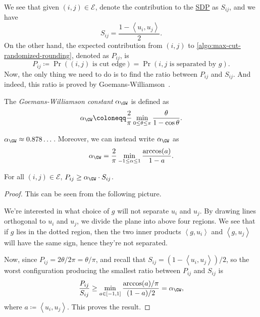 We see that given \((i, j)\in \mathcal{E} \), denote the contribution to the \hyperref[eq:max-cut]{SDP} as \(S_{ij} \), and we have
\[
	S_{ij}= \frac{1 - \left\langle u_i, u_j \right\rangle }{2}.
\]
On the other hand, the expected contribution from \((i, j)\) to \autoref{algo:max-cut-randomized-rounding}, denoted as \(P_{ij} \), is
\[
	P_{ij}\coloneqq  \Pr((i, j)\text{ is cut edge} ) = \Pr(i, j \text{ is separated by \(g\)} ).
\]
Now, the only thing we need to do is to find the ratio between \(P_{ij} \) and \(S_{ij} \). And indeed, this ratio is proved by Goemans-Williamson~\cite{goemans1995improved}.

\begin{notation}\label{not:GW}
	The \emph{Goemans-Williamson constant} \(\alpha _{\GW }\) is defined as
	\[
		\alpha _{\GW }\coloneqq \frac{2}{\pi }\min _{0 \leq \theta \leq \pi }\frac{\theta }{1 - \cos \theta }.
	\]
\end{notation}

\begin{remark}
	\(\alpha _{\GW }\approx 0.878\dots \). Moreover, we can instead write \(\alpha _\GW \) as
	\[
		\alpha _{\GW } = \frac{2}{\pi }\min _{-1\leq \alpha \leq 1} \frac{\arccos(a)}{1 - a}.
	\]
\end{remark}

\begin{lemma}\label{lma:max-cut}
	For all \((i, j)\in \mathcal{E} \), \(P_{ij} \geq \alpha _{\GW } \cdot S_{ij} \).
\end{lemma}
\begin{proof}
	This can be seen from the following picture.
	\begin{center}
	\end{center}
	We're interested in what choice of \(g\) will not separate \(u_i\) and \(u_j\). By drawing lines orthogonal to \(u_i\) and \(u_j\), we divide the plane into above four regions. We see that if \(g\) lies in the dotted region, then the two inner products \(\left\langle g, u_i \right\rangle \) and \(\left\langle g, u_j \right\rangle \) will have the same sign, hence they're not separated.

	Now, since \(P_{ij} = 2\theta / 2\pi = \theta / \pi\), and recall that \(S_{ij} = (1 - \left\langle u_i, u_j \right\rangle) / 2 \), so the worst configuration producing the smallest ratio between \(P_{ij} \) and \(S_{ij} \) is
	\[
		\frac{P_{ij}}{S_{ij} } \geq \min _{a\in [-1, 1]} \frac{\arccos(a) / \pi }{(1-a) / 2} = \alpha _\GW,
	\]
	where \(a \coloneqq \left\langle u_i, u_j \right\rangle\). This proves the result.
\end{proof}

